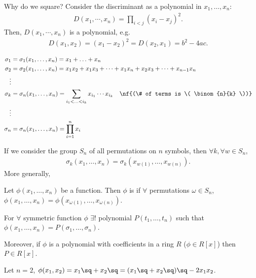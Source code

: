 \documentclass[a4paper]{article}
\begin{document}
Why do we square? Consider the discriminant as a polynomial in $ x_1,\ldots,x_n $:
\begin{align*}
  D(x_1,\cdots,x_n) = \prod_{i<j}(x_i-x_j)^2.
\end{align*}
Then, $ D(x_1,\cdots,x_n) $ is a  polynomial, e.g. \begin{align*}
  D(x_1,x_2) = (x_1-x_2)^2 = D(x_2,x_1) = b^2-4ac.
\end{align*}

\begin{tdefinition}
  \begin{align*}
    \sigma_1 &= \sigma_1(x_1,\ldots, x_n)= x_1+\ldots+x_n \\
    \sigma_2 &= \sigma_2(x_1,\ldots, x_n)= x_1x_2+x_1x_3+\cdots+x_1x_n+x_2x_3+\cdots+x_{n-1}x_n \\
    \vdots \\
    \sigma_k &= \sigma_n(x_1,\ldots, x_n)= \sum_{i_1<\ldots<i_ k} x_{i_1}\cdots x_{i_k} \quad \nf {(\# of terms is \( \binom{n}{k} \))} \\
    \vdots \\
    \sigma_n &= \sigma_n(x_1,\ldots, x_n)= \prod_{i=1}^{n} x_i
  \end{align*}
\end{tdefinition}

If we consider the group $ S_n $ of all permutations on $ n $ symbols, then $ \forall k, \forall w\in S_n $, \begin{align*}
  \sigma_k(x_1,\ldots,x_n) = \sigma_k(x_{w(1)},\ldots,x_{w(n)}).
\end{align*}
More generally,
\begin{tdefinition}
  Let \( \phi(x_1, \ldots, x_n) \) be a function. Then \( \phi \) is  if \( \forall \) permutations \( \omega\in S_n \), \( \phi(x_1,\ldots, x_n) = \phi(x_{\omega(1)},\ldots,x_{\omega(n)})\).
\end{tdefinition}

\begin{ttheorem} For \( \forall \) symmetric function \( \phi \) \( \exists ! \) polynomial \( P(t_1, \ldots,t_n) \) such that \( \phi(x_1,\ldots,x_n) =P(\sigma_1,\ldots,\sigma_n)\).

Moreover, if \( \phi \) is a polynomial with coefficients in a ring \( R \) (\( \phi\in R[x] \)) then \( P\in R[x] \).
\end{ttheorem}

\begin{example}
  Let $ n=2 $, $ \phi(x_1,x_2) = x_1\sq+x_2\sq = (x_1\sq+x_2\sq)\sq - 2x_1x_2 $.
\end{example}
\end{document}
